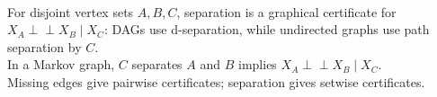 \begin{remark} \label{rem:sl-separation-graphical-models} \\
For disjoint vertex sets $A,B,C$, separation is a graphical certificate for $X_A\perp\!\!\!\perp X_B\mid X_C$: DAGs use d-separation, while undirected graphs use path separation by $C$.\\
In a Markov graph, $C$ separates $A$ and $B$ implies $X_A\perp\!\!\!\perp X_B\mid X_C$.\\
Missing edges give pairwise certificates; separation gives setwise certificates.
\end{remark}
